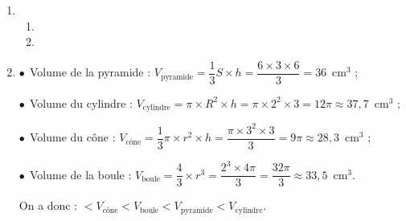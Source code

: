 \documentclass[10pt]{article}
\begin{document}
%
%
%
%
%
\begin{enumerate}
\item
\begin{enumerate}

\item %

\item %
\end{enumerate}
\item %
$\bullet~~$Volume de la pyramide : $V_{\text{pyramide}}  = \dfrac{1}{3} S \times h = \dfrac{6 \times 3 \times 6}{3} = 36$~cm$^3$ ;

$\bullet~~$Volume du cylindre : $V_{\text{cylindre}} =  \pi \times R^2 \times h = \pi \times 2^2 \times 3 = 12 \pi \approx 37,7$~cm$^3$ ;

$\bullet~~$Volume du cône : $V_{\text{cône}}  = \dfrac{1}{3} \pi \times r^2 \times h = \dfrac{\pi \times 3^2 \times 3}{3} = 9\pi \approx 28,3$~cm$^3$ ;

$\bullet~~$Volume de la boule : $V_{\text{boule}}  = \dfrac{4}{3}\times r^3 = \dfrac{2^3 \times 4 \pi}{3} = \dfrac{32\pi}{3} \approx 33,5$~cm$^3$.

On a donc : $ < V_{\text{cône}}  < V_{\text{boule}} < V_{\text{pyramide}} < V_{\text{cylindre}}$.
\end{enumerate}

%
%
%
%

\bigskip
\end{document}
